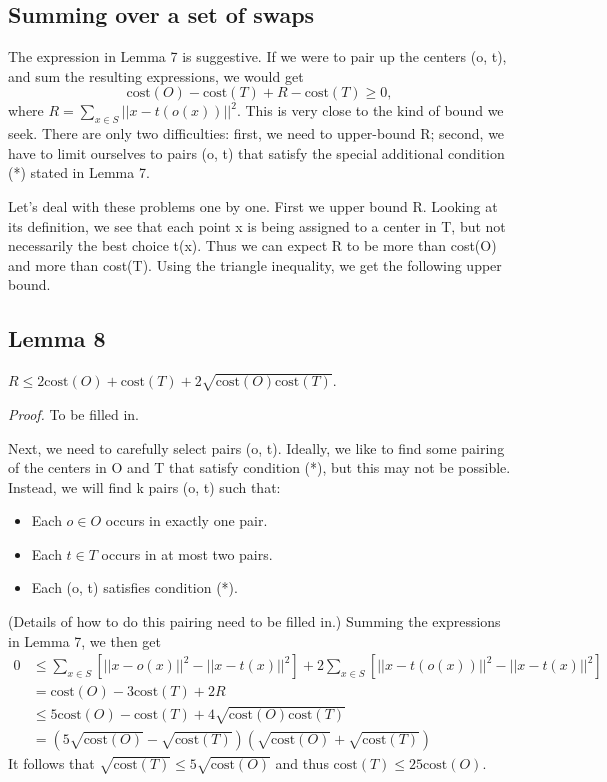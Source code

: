 \documentclass{article}
\begin{document}
\subsection{Summing over a set of swaps}

The expression in Lemma 7 is suggestive. If we were to pair up the centers (o, t), and sum the resulting expressions, we would get
\[ \text{cost}(O) - \text{cost}(T) + R - \text{cost}(T) \ge 0, \]
where $R = \sum_{x \in S} ||x - t(o(x))||^2$. This is very close to the kind of bound we seek. There are only two difficulties: first, we need to upper-bound R; second, we have to limit ourselves to pairs (o, t) that satisfy the special additional condition (*) stated in Lemma 7.

Let's deal with these problems one by one. First we upper bound R. Looking at its definition, we see that each point x is being assigned to a center in T, but not necessarily the best choice t(x). Thus we can expect R to be more than cost(O) and more than cost(T). Using the triangle inequality, we get the following upper bound.

\subsection*{Lemma 8}
$R \le 2\text{cost}(O) + \text{cost}(T) + 2\sqrt{\text{cost}(O)\text{cost}(T)}$.

\textit{Proof.} To be filled in.

Next, we need to carefully select pairs (o, t). Ideally, we like to find some pairing of the centers in O and T that satisfy condition (*), but this may not be possible. Instead, we will find k pairs (o, t) such that:
\begin{itemize}
    \item Each $o \in O$ occurs in exactly one pair.
    \item Each $t \in T$ occurs in at most two pairs.
    \item Each (o, t) satisfies condition (*).
\end{itemize}
(Details of how to do this pairing need to be filled in.) Summing the expressions in Lemma 7, we then get
\begin{align*}
0 &\le \sum_{x \in S} [||x - o(x)||^2 - ||x - t(x)||^2] + 2\sum_{x \in S} [||x - t(o(x))||^2 - ||x - t(x)||^2] \\
&= \text{cost}(O) - 3\text{cost}(T) + 2R \\
&\le 5\text{cost}(O) - \text{cost}(T) + 4\sqrt{\text{cost}(O)\text{cost}(T)} \\
&= (5\sqrt{\text{cost}(O)} - \sqrt{\text{cost}(T)})(\sqrt{\text{cost}(O)} + \sqrt{\text{cost}(T)})
\end{align*}
It follows that $\sqrt{\text{cost}(T)} \le 5\sqrt{\text{cost}(O)}$ and thus $\text{cost}(T) \le 25\text{cost}(O)$.
\end{document}
